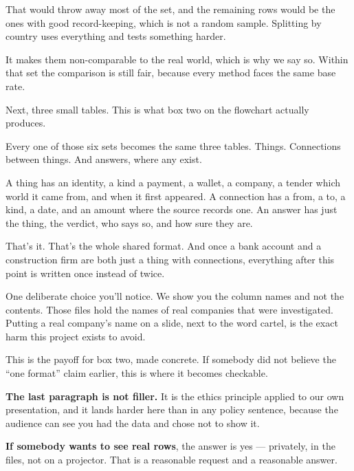 \documentclass[11pt]{article}
\begin{document}
\begin{asked}
 That would throw away most of the
set, and the remaining rows would be the ones with good record-keeping, which is
not a random sample. Splitting by country uses everything and tests something
harder.

 It
makes them non-comparable to the real world, which is why we say so. Within that
set the comparison is still fair, because every method faces the same base rate.
\end{asked}


\begin{saythis}
Next, three small tables. This is what box two on the flowchart actually
produces.

Every one of those six sets becomes the same three tables. Things. Connections
between things. And answers, where any exist.

A thing has an identity, a kind \bt a payment, a wallet, a company, a tender \bt
which world it came from, and when it first appeared. A connection has a from,
a to, a kind, a date, and an amount where the source records one. An answer has
just the thing, the verdict, who says so, and how sure they are.

That's it. That's the whole shared format. And once a bank account and a
construction firm are both just a thing with connections, everything after this
point is written once instead of twice.

One deliberate choice you'll notice. We show you the column names and not the
contents. Those files hold the names of real companies that were investigated.
Putting a real company's name on a slide, next to the word cartel, is the exact
harm this project exists to avoid.
\end{saythis}

\begin{means}
This is the payoff for box two, made concrete. If somebody did not believe the
``one format'' claim earlier, this is where it becomes checkable.

\textbf{The last paragraph is not filler.} It is the ethics principle applied to
our own presentation, and it lands harder here than in any policy sentence,
because the audience can see you had the data and chose not to show it.

\textbf{If somebody wants to see real rows}, the answer is yes --- privately, in
the files, not on a projector. That is a reasonable request and a reasonable
answer.
\end{means}
\end{document}
